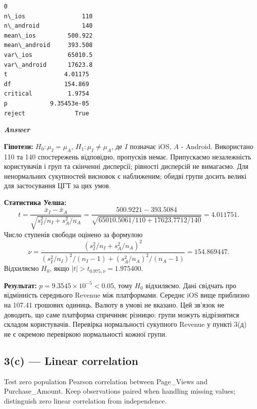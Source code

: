 \documentclass[11pt]{article}
\begin{document}
    
    \begin{Verbatim}[commandchars=\\\{\}]
                       0
n\_ios                110
n\_android            140
mean\_ios         500.922
mean\_android     393.508
var\_ios          65010.5
var\_android      17623.8
t                4.01175
df               154.869
critical          1.9754
p            9.35453e-05
reject              True
    \end{Verbatim}

    
    \textbf{\emph{Answer}}

\textbf{Гіпотези:} \(H_0:\mu_I=\mu_A\), \(H_1:\mu_I\ne\mu_A\), де \(I\)
позначає iOS, \(A\) - Android. Використано 110 та 140 спостережень
відповідно, пропусків немає. Припускаємо незалежність користувачів і
груп та скінченні дисперсії; рівності дисперсій не вимагаємо. Для
ненормальних сукупностей висновок є наближеним; обидві групи досить
великі для застосування ЦГТ за цих умов.

\textbf{Статистика Уелша:}
\[t=\frac{\bar x_I-\bar x_A}{\sqrt{s_I^2/n_I+s_A^2/n_A}}
=\frac{500.9221-393.5084}{\sqrt{65010.5061/110+17623.7712/140}}=4.011751.\]
Число ступенів свободи оцінено за формулою
\[\nu=\frac{(s_I^2/n_I+s_A^2/n_A)^2}{(s_I^2/n_I)^2/(n_I-1)+(s_A^2/n_A)^2/(n_A-1)}=154.869447.\]
Відхиляємо \(H_0\), якщо \(|t|>t_{0.975,\nu}=1.975400\).

\textbf{Результат:} \(p=9.3545\times 10^{-5}<0.05\), тому \(H_0\)
відхиляємо. Дані свідчать про відмінність середнього Revenue між
платформами. Середнє iOS вище приблизно на 107.41 грошових одиниць.
Валюту в умові не вказано. Цей зв'язок не доводить, що саме платформа
спричиняє різницю: групи можуть відрізнятися складом користувачів.
Перевірка нормальності сукупного Revenue у пункті 3(д) не є окремою
перевіркою нормальності кожної групи.

    \subsection{3(c) --- Linear correlation}\label{c-linear-correlation}

Test zero population Pearson correlation between Page\_Views and
Purchase\_Amount. Keep observations paired when handling missing values;
distinguish zero linear correlation from independence.
\end{document}
